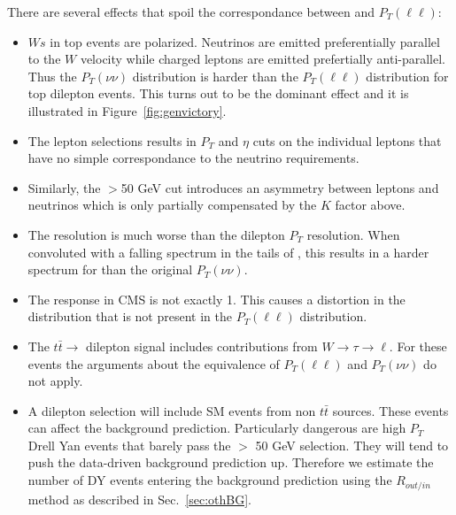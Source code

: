 There are several effects that spoil the correspondance between \met and
$P_T(\ell\ell)$: 
\begin{itemize}
\item $Ws$ in top events are polarized.  Neutrinos are emitted preferentially
parallel to the $W$ velocity while charged leptons are emitted prefertially
anti-parallel. Thus the $P_T(\nu\nu)$ distribution is harder
than the $P_T(\ell\ell)$ distribution for top dilepton events.
This turns out to be the dominant effect and it is illustrated in 
Figure~\ref{fig:genvictory}.
\item The lepton selections results in $P_T$ and $\eta$ cuts on the individual
leptons that have no simple correspondance to the neutrino requirements.
\item Similarly, the \met$>$50 GeV cut introduces an asymmetry between leptons and
neutrinos which is only partially compensated by the $K$ factor above.
\item The \met resolution is much worse than the dilepton $P_T$ resolution.
When convoluted with a falling spectrum in the tails of \met, this results
in a harder spectrum for \met than the original $P_T(\nu\nu)$.
\item The \met response in CMS is not exactly 1.  This causes a distortion
in the \met distribution that is not present in the $P_T(\ell\ell)$ distribution.
\item The $t\bar{t} \to$ dilepton signal includes contributions from 
$W \to \tau \to \ell$.  For these events the arguments about the equivalence 
of $P_T(\ell\ell)$ and $P_T(\nu\nu)$ do not apply.
\item A dilepton selection will include SM events from non $t\bar{t}$ 
sources.  These events can affect the background prediction.  Particularly 
dangerous are high $P_T$ Drell Yan events that barely pass the \met$>$ 50 
GeV selection.  They will tend to push the data-driven background prediction up.
Therefore we estimate the number of DY events entering the background prediction
using the $R_{out/in}$ method as described in Sec.~\ref{sec:othBG}.
\end{itemize}

